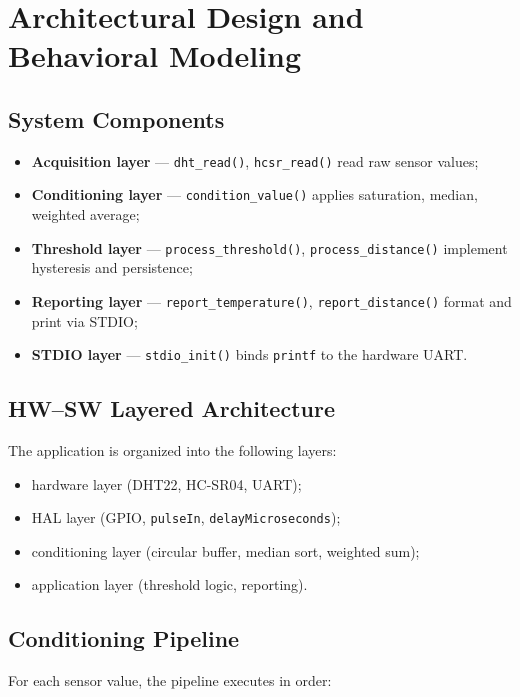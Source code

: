 \documentclass[12pt,a4paper]{article}
\begin{document}
\section{Architectural Design and Behavioral Modeling}

\subsection{System Components}
\begin{itemize}
    \item \textbf{Acquisition layer} — \texttt{dht\_read()}, \texttt{hcsr\_read()} read raw sensor values;
    \item \textbf{Conditioning layer} — \texttt{condition\_value()} applies saturation, median, weighted average;
    \item \textbf{Threshold layer} — \texttt{process\_threshold()}, \texttt{process\_distance()} implement hysteresis and persistence;
    \item \textbf{Reporting layer} — \texttt{report\_temperature()}, \texttt{report\_distance()} format and print via STDIO;
    \item \textbf{STDIO layer} — \texttt{stdio\_init()} binds \texttt{printf} to the hardware UART.
\end{itemize}

\subsection{HW--SW Layered Architecture}
The application is organized into the following layers:
\begin{itemize}
    \item hardware layer (DHT22, HC-SR04, UART);
    \item HAL layer (GPIO, \texttt{pulseIn}, \texttt{delayMicroseconds});
    \item conditioning layer (circular buffer, median sort, weighted sum);
    \item application layer (threshold logic, reporting).
\end{itemize}

\subsection{Conditioning Pipeline}
For each sensor value, the pipeline executes in order:
\end{document}
